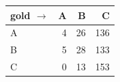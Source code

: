 \begin{tabular}{lrrr}
\toprule
gold $\to$  & A & B & C \\
\midrule
A & 4 & 26 & 136 \\
B & 5 & 28 & 133 \\
C & 0 & 13 & 153 \\
\bottomrule
\end{tabular}
